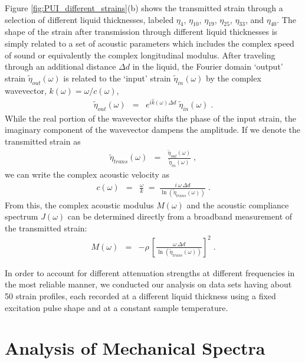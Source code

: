 \documentclass[reprint,showpacs,amsmath,amssymb,aip,jcp]{revtex4-1}
\begin{document}
Figure \ref{fig:PUI_different_strains}(b) shows the transmitted
strain through a selection of different liquid thicknesses, labeled
$\eta_4$, $\eta_{10}$, $\eta_{19}$, $\eta_{25}$, $\eta_{33}$, and
$\eta_{40}$. The shape of the strain after transmission through
different liquid thicknesses is simply related to a set of acoustic
parameters which includes the complex speed of sound or equivalently
the complex longitudinal modulus. After traveling through an
additional distance $\Delta d$ in the liquid, the Fourier domain
`output' strain $\tilde{\eta}_{out}(\omega)$ is related to the
`input' strain $\tilde{\eta}_{in}(\omega)$ by the complex
wavevector, $k(\omega)=\omega/c(\omega)$,
\begin{eqnarray}
  \tilde{\eta}_{out}(\omega) & = & e^{i\hat{k}(\omega) \Delta d} \;
  \tilde{\eta}_{in}(\omega) \;.
\end{eqnarray}
While the real portion of the wavevector shifts the phase of the input
strain, the imaginary component of the wavevector dampens the
amplitude. If we denote the transmitted strain as
\begin{eqnarray}
  \tilde{\eta}_{trans}(\omega) &=&
  \frac{\tilde{\eta}_{out}(\omega)}{\tilde{\eta}_{in}(\omega)} \;,
\end{eqnarray}
we can write the complex acoustic velocity as
\begin{eqnarray}
  c(\omega) &=& \frac{\omega}{k} \;=\;
  \frac{i\,\omega\,\Delta d}{\ln(\tilde{\eta}_{trans}(\omega))} \;.
\end{eqnarray}
From this, the complex acoustic modulus $M(\omega)$ and the
acoustic compliance spectrum $J(\omega)$ can be determined
directly from a broadband measurement of the transmitted strain:
\begin{eqnarray}
  M(\omega) &=& - \rho \, \left[ \frac{\omega\,\Delta
      d}{\ln(\tilde{\eta}_{trans}(\omega))} \right]^2 \;.
\end{eqnarray}

In order to account for different attenuation strengths at different
frequencies in the most reliable manner, we conducted our analysis on
data sets having about 50 strain profiles, each recorded at a
different liquid thickness using a fixed excitation pulse shape and at
a constant sample temperature.




\section{Analysis of Mechanical Spectra}\label{sec:phen-analys}
\end{document}
